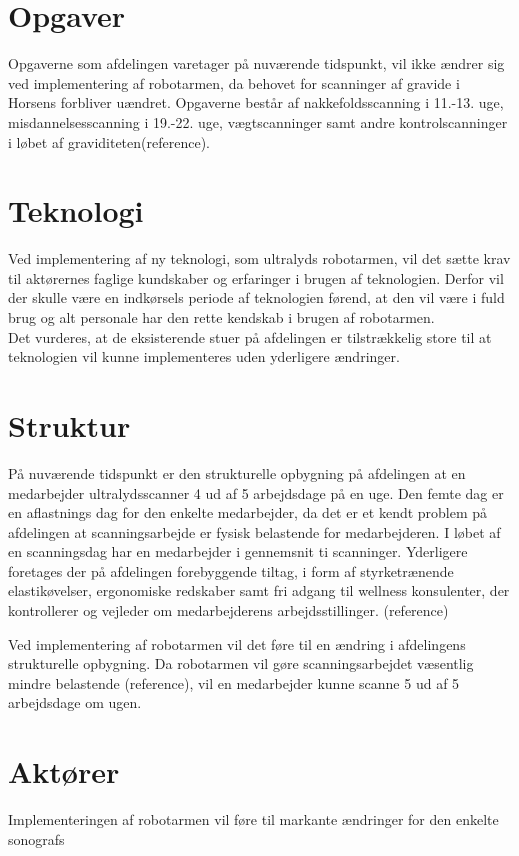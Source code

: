 \section{Opgaver}
Opgaverne som afdelingen varetager på nuværende tidspunkt, vil ikke ændrer sig ved implementering af robotarmen, da behovet for scanninger af gravide i Horsens forbliver uændret. Opgaverne består af nakkefoldsscanning i 11.-13. uge, misdannelsesscanning i 19.-22. uge, vægtscanninger samt andre kontrolscanninger i løbet af graviditeten(reference). 

\section{Teknologi}
Ved implementering af ny teknologi, som ultralyds robotarmen, vil det sætte krav til aktørernes faglige kundskaber og erfaringer i brugen af teknologien. Derfor vil der skulle være en indkørsels periode af teknologien førend, at den vil være i fuld brug og alt personale har den rette kendskab i brugen af robotarmen. \\
Det vurderes, at de eksisterende stuer på afdelingen er tilstrækkelig store til at teknologien vil kunne implementeres uden yderligere ændringer.

\section{Struktur}
På nuværende tidspunkt er den strukturelle opbygning på afdelingen at en medarbejder ultralydsscanner 4 ud af 5 arbejdsdage på en uge. Den femte dag er en aflastnings dag for den enkelte medarbejder, da det er et kendt problem på afdelingen at scanningsarbejde er fysisk belastende for medarbejderen. I løbet af en scanningsdag har en medarbejder i gennemsnit ti scanninger. Yderligere foretages der på afdelingen forebyggende tiltag, i form af styrketrænende elastikøvelser, ergonomiske redskaber samt fri adgang til wellness konsulenter, der kontrollerer og vejleder om medarbejderens arbejdsstillinger. (reference)

Ved implementering af robotarmen vil det føre til en ændring i afdelingens strukturelle opbygning. Da robotarmen vil gøre scanningsarbejdet væsentlig mindre belastende (reference), vil en medarbejder kunne scanne 5 ud af 5 arbejdsdage om ugen.  

\section{Aktører}
Implementeringen af robotarmen vil føre til markante ændringer for den enkelte sonografs 


